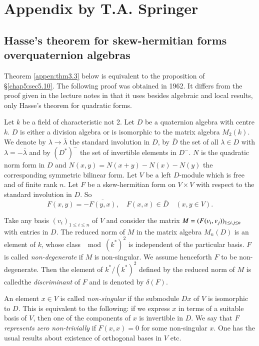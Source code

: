 

\chapter*{Appendix by T.A. Springer}

\section*{Hasse's theorem for skew-hermitian forms over\hfil\break quaternion
  algebras}\pageoriginale  

Theorem \ref{appen:thm3.3} below is equivalent to the proposition of
\S \ref{chap5:sec5.10}. The 
following proof was obtained in 1962. It differs from the proof
given in the lecture notes in that it uses besides algebraic and local
results, only Hasse's theorem for quadratic forms. 


\medskip
{}

Let $k$ be a field of characteristic not 2. Let $D$ be a quaternion
algebra with centre $k$. $D$ is either a division algebra or is
isomorphic to the matrix algebra $M_2(k)$. We denote by $\lambda \to
\bar{\lambda}$ the standard involution in $D$, by $\bar{D}$ the set of
all $\lambda \in D$ with $\lambda = - \bar{\lambda}$ and by $(D^*)^-$
the set of invertible elements in $D^-$. $N$ is the quadratic norm
form in $D$ and $N(x,y)=N(x+y)-N(x)-N(y)$ the corresponding symmetric
bilinear form. Let $V$ be a left $D$-module which is free and of
finite rank $n$. Let $F$ be a skew-hermitian form on $V \times V$ with
respect to the standard involution in $D$. So 
$$
F(x,y)= - \overline{F(y,x)}, \quad F(x,x) \in \bar{D} \quad  (x,y \in V). 
$$

Take any basis $(v_i)_{1 \le i \le n}$ of $V$ and consider the matrix
$M=(F(v_i,\break v_j))_{1 \le i,j \le n}$ with entries in $D$. The reduced
norm of $M$ in the matrix algebra $M_n(D)$ is an element of $k$, whose
class $\mod (k^*)^2$ is independent of the particular basis. $F$ is
called \textit{non-degenerate} if $M$ is non-singular. We assume
henceforth $F$ to be non-degenerate. Then the element of $k^*/(k^*)^2$
defined by the reduced norm of $M$ is called\pageoriginale the
\textit{discriminant} of $F$ and is denoted by $\delta(F)$.  

An element $x \in V$ is called \textit{non-singular} if the submodule
$Dx$ of $V$ is isomorphic to $D$. This is equivalent to the following:
if we express $x$ in terms of a suitable basis of $V$, then one of the
components of $x$ is invertible in $D$. We say that $F$
\textit{represents zero non-trivially} if $F(x,x)=0$ for some
non-singular $x$. One has the usual results about existence of
orthogonal bases in $V$ etc. 

